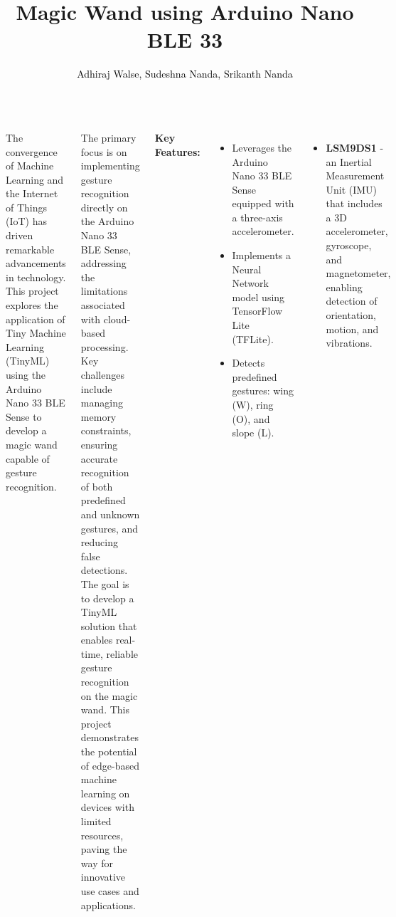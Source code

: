 \documentclass[25pt,a0paper, portrait]{tikzposter}
\title{Magic Wand using Arduino Nano BLE 33}
\author{\textcolor{black}{Adhiraj Walse, Sudeshna Nanda, Srikanth Nanda}}
\begin{document}
	
	\maketitle
	
	\begin{columns} 
		
		{
			
			{
				The convergence of Machine Learning and the Internet of Things (IoT) has driven remarkable advancements in technology. This project explores the application of Tiny Machine Learning (TinyML) using the Arduino Nano 33 BLE Sense to develop a magic wand capable of gesture recognition.  
				
				The primary focus is on implementing gesture recognition directly on the Arduino Nano 33 BLE Sense, addressing the limitations associated with cloud-based processing. Key challenges include managing memory constraints, ensuring accurate recognition of both predefined and unknown gestures, and reducing false detections. The goal is to develop a TinyML solution that enables real-time, reliable gesture recognition on the magic wand. This project demonstrates the potential of edge-based machine learning on devices with limited resources, paving the way for innovative use cases and applications.
				
				\textbf{Key Features:}
				
				\begin{itemize}
					
					\item Leverages the Arduino Nano 33 BLE Sense equipped with a three-axis accelerometer.
					
					\item Implements a Neural Network model using TensorFlow Lite (TFLite).
					
					\item Detects predefined gestures: wing (W), ring (O), and slope (L).
					
				\end{itemize}
				
			}


			{
				\begin{itemize}
					
					\item \textbf{LSM9DS1} - an Inertial Measurement Unit (IMU) that includes a 3D accelerometer, gyroscope, and magnetometer, enabling detection of orientation, motion, and vibrations.
					

\end{itemize}}}
\end{columns}
\end{document}
